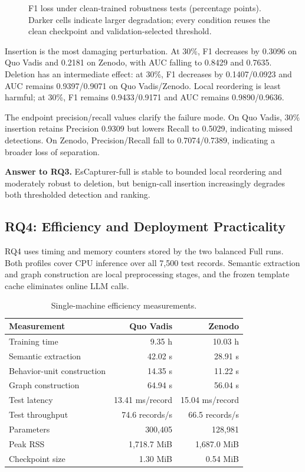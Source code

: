 \begin{figure}[!t]
\centering
{}
\caption{F1 loss under clean-trained robustness tests (percentage points).
Darker cells indicate larger degradation; every condition reuses the clean
checkpoint and validation-selected threshold.}
\label{fig:rq3-robustness}
\end{figure}

Insertion is the most damaging perturbation.  At 30\%, F1 decreases by
0.3096 on Quo Vadis and 0.2181 on Zenodo, with AUC falling to 0.8429 and
0.7635.  Deletion has an intermediate effect: at 30\%, F1 decreases by
0.1407/0.0923 and AUC remains 0.9397/0.9071 on Quo Vadis/Zenodo.  Local
reordering is least harmful; at 30\%, F1 remains 0.9433/0.9171 and AUC
remains 0.9890/0.9636.

The endpoint precision/recall values clarify the failure mode.  On Quo Vadis,
30\% insertion retains Precision 0.9309 but lowers Recall to 0.5029,
indicating missed detections.  On Zenodo, Precision/Recall fall to
0.7074/0.7389, indicating a broader loss of separation.

\noindent\textbf{Answer to RQ3.}
EsCapturer-full is stable to bounded local reordering and moderately robust to
deletion, but benign-call insertion increasingly degrades both thresholded
detection and ranking.

\subsection{RQ4: Efficiency and Deployment Practicality}
\label{sec:rq4}

RQ4 uses timing and memory counters stored by the two balanced Full runs.
Both profiles cover CPU inference over all 7,500 test records.  Semantic
extraction and graph construction are local preprocessing stages, and the
frozen template cache eliminates online LLM calls.

\begin{table}[!t]
\caption{Single-machine efficiency measurements.}
\label{tab:rq4-efficiency}
\centering
\scriptsize
\setlength{\tabcolsep}{4.5pt}
\begin{tabular}{lrr}
\hline
Measurement & Quo Vadis & Zenodo \\
\hline
Training time & 9.35 h & 10.03 h \\
Semantic extraction & 42.02 s & 28.91 s \\
Behavior-unit construction & 14.35 s & 11.22 s \\
Graph construction & 64.94 s & 56.04 s \\
Test latency & 13.41 ms/record & 15.04 ms/record \\
Test throughput & 74.6 records/s & 66.5 records/s \\
Parameters & 300,405 & 128,981 \\
Peak RSS & 1,718.7 MiB & 1,687.0 MiB \\
Checkpoint size & 1.30 MiB & 0.54 MiB \\
\hline
\end{tabular}
\end{table}

